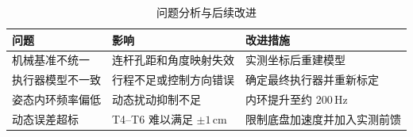 \documentclass[UTF8,a4paper,12pt]{ctexart}
\begin{document}
\begin{table}[H]
  \centering
  \caption{问题分析与后续改进}
  \label{tab:improvements}
  \begin{tabularx}{\textwidth}{>{\raggedright\arraybackslash}p{}>{\raggedright\arraybackslash}p{}X}
    \toprule
    问题 & 影响 & 改进措施 \\
    \midrule
    机械基准不统一 & 连杆孔距和角度映射失效 & 实测坐标后重建模型 \\
    执行器模型不一致 & 行程不足或控制方向错误 & 确定最终执行器并重新标定 \\
    姿态内环频率偏低 & 动态扰动抑制不足 & 内环提升至约 200\,Hz \\
    动态误差超标 & T4--T6 难以满足 $\pm1\,\mathrm{cm}$ & 限制底盘加速度并加入实测前馈 \\
    \bottomrule
  \end{tabularx}
\end{table}
\end{document}
